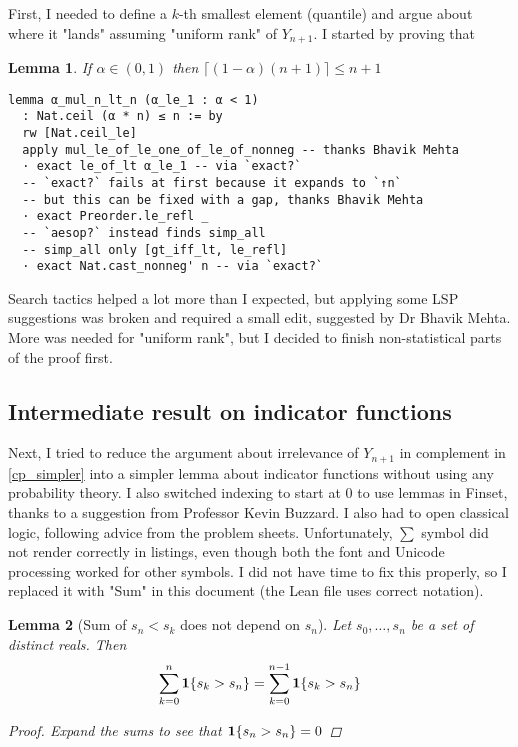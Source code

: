 \documentclass[a4paper, 12pt]{article}
\newtheorem{lemma}{Lemma}
\def\ind{\bold{1}}
\begin{document}
First, I needed to define a $k$-th smallest element (quantile)
and argue about where it "lands" assuming "uniform rank" of $Y_{n+1}$.
I started by proving that

\begin{lemma}
If $\alpha\in (0, 1)$ then
$\lceil(1-\alpha)(n+1)\rceil \le n+1$
\end{lemma}

\begin{lstlisting}
lemma α_mul_n_lt_n (α_le_1 : α < 1)
  : Nat.ceil (α * n) ≤ n := by
  rw [Nat.ceil_le]
  apply mul_le_of_le_one_of_le_of_nonneg -- thanks Bhavik Mehta
  · exact le_of_lt α_le_1 -- via `exact?`
  -- `exact?` fails at first because it expands to `↑n`
  -- but this can be fixed with a gap, thanks Bhavik Mehta
  · exact Preorder.le_refl _
  -- `aesop?` instead finds simp_all
  -- simp_all only [gt_iff_lt, le_refl]
  · exact Nat.cast_nonneg' n -- via `exact?`
\end{lstlisting}

Search tactics helped a lot more than I expected,
but applying some LSP suggestions was broken
and required a small edit, suggested by Dr Bhavik Mehta.
More was needed for "uniform rank",
but I decided to finish non-statistical parts
of the proof first.

\subsection*{Intermediate result on indicator functions}

Next, I tried to reduce the argument about
irrelevance of $Y_{n+1}$ in complement in \ref{cp_simpler}
into a simpler lemma about indicator functions
without using any probability theory.
I also switched indexing to start at $0$
to use lemmas in Finset,
thanks to a suggestion from Professor Kevin Buzzard.
I also had to open classical logic,
following advice from the problem sheets.
Unfortunately, $\sum$ symbol did not render correctly in listings,
even though both the font and Unicode processing worked for other symbols.
I did not have time to fix this properly,
so I replaced it with "Sum" in this document
(the Lean file uses correct notation).

\begin{lemma}[Sum of $s_n<s_k$ does not depend on $s_n$]
\label{cp_simplest}
Let $s_0,\ldots,s_n$ be a set of distinct reals. Then
$$\sum_{k=0}^n \ind\{s_k > s_n\}=\sum_{k=0}^{n-1} \ind\{s_k > s_n\}$$
\begin{proof}
  Expand the sums to see that $\ind\{s_n > s_n\}=0$
\end{proof}
\end{lemma}
\end{document}
